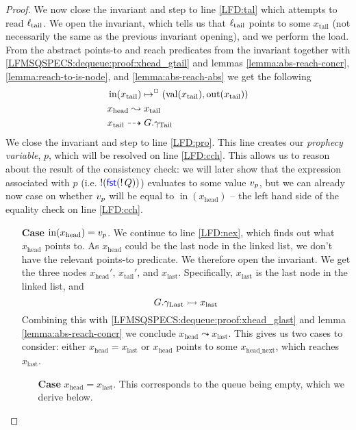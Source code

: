 \documentclass[a4paper, 10pt]{report}
\theoremstyle{definition}
\newcommand{\locN}[1]{\loc_{\mathrm{#1}}}
\newcommand{\loctail}{\locN{tail}}
\newcommand{\nIn}[1]{\operatorname{in}(#1)}
\newcommand{\nVal}[1]{\operatorname{val}(#1)}
\newcommand{\nOut}[1]{\operatorname{out}(#1)}
\newcommand{\node}{x}
\newcommand{\nodeN}[1]{\node_{\mathrm{#1}}}
\newcommand{\nodehead}{\nodeN{head}}
\newcommand{\nodetail}{\nodeN{tail}}
\newcommand{\nodelast}{\nodeN{last}}
\newcommand{\nodeheadnext}{\nodeN{head\_next}}
\newcommand{\prophval}{\val_p}
\newcommand{\Qg}{G}
\newcommand{\gtail}{\gname_{\mathrm{Tail}}}
\newcommand{\glast}{\gname_{\mathrm{Last}}}
\newcommand{\isNode}[1]{\nIn{#1} \mapsto^{\persistently} (\nVal{#1}, \nOut{#1})}
\newcommand{\reach}[2]{#1 \leadsto #2}
\newcommand{\ar}[2]{#1 \dashrightarrow #2}
\newcommand{\ap}[2]{#1 \rightarrowtail #2}
\begin{document}
\begin{proof}
  We now close the invariant and step to line \ref{LFD:tal} which attempts to read $\loctail$. We open the invariant, which tells us that $\loctail$ points to some $\nodetail$ (not necessarily the same as the previous invariant opening), and we perform the load. From the abstract points-to and reach predicates from the invariant together with \ref{LFMSQSPECS:dequeue:proof:xhead_gtail} and lemmas \ref{lemma:abs-reach-concr}, \ref{lemma:reach-to-is-node}, and \ref{lemma:abs-reach-abs} we get the following
  \begin{align}
    &\isNode{\nodetail}\label{LFMSQSPECS:dequeue:proof:xtail_node}\\
    &\reach{\nodehead}{\nodetail}\label{LFMSQSPECS:dequeue:proof:xhead_r_xtail}\\
    &\ar{\nodetail}{\Qg.\gtail}\label{LFMSQSPECS:dequeue:proof:xtail_gtail}\\
  \end{align}
  We close the invariant and step to line \ref{LFD:pro}. This line creates our \textit{prophecy variable}, $p$, which will be resolved on line \ref{LFD:cch}. This allows us to reason about the result of the consistency check: we will later show that the expression associated with $p$ (i.e. $\mathop{!}(\operatorname{\textsf{\color{blue} fst}} (\mathop{!} Q))$) evaluates to some value $\prophval$, but we can already now case on whether $\prophval$ will be equal to $\nIn{\nodehead}$ -- the left hand side of the equality check on line \ref{LFD:cch}.
  \begin{itemize}
    \item[\textbf{Case}] $\nIn{\nodehead} = \prophval$.
    We continue to line \ref{LFD:nex}, which finds out what $\nodehead$ points to. As $\nodehead$ could be the last node in the linked list, we don't have the relevant points-to predicate. We therefore open the invariant. We get the three nodes $\nodehead'$, $\nodetail'$, and $\nodelast$. Specifically, $\nodelast$ is the last node in the linked list, and
    \begin{equation}\label{LFMSQSPECS:dequeue:proof:glast_xlast}
      \ap{\Qg.\glast}{\nodelast}
    \end{equation}
    Combining this with \ref{LFMSQSPECS:dequeue:proof:xhead_glast} and lemma \ref{lemma:abs-reach-concr} we conclude $\reach{\nodehead}{\nodelast}$. This gives us two cases to consider: either $\nodehead = \nodelast$ or $\nodehead$ points to some $\nodeheadnext$, which reaches $\nodelast$.
    \begin{itemize}
      \item[\textbf{Case}] $\nodehead = \nodelast$. This corresponds to the queue being empty, which we derive below.\\

\end{itemize}
\end{itemize}
\end{proof}
\end{document}
